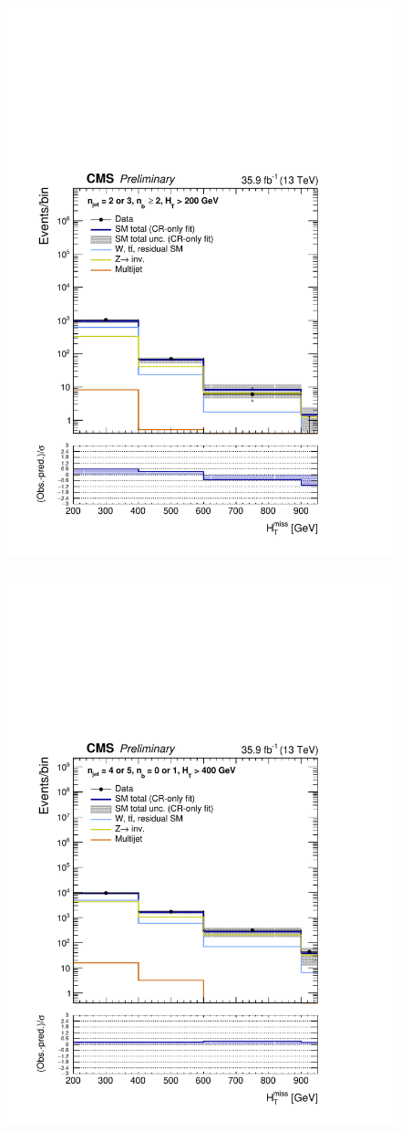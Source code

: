 \begin{figure}[h!]
  \includegraphics[width=0.8\linewidth]{figures/results/36invfb/aggregated/postFitShapeCR/mhtShape_ge2b_eq23j_200_Inf_crfit.pdf} ~
  \includegraphics[width=0.8\linewidth]{figures/results/36invfb/aggregated/postFitShapeCR/mhtShape_eq01b_eq45j_400_Inf_crfit.pdf} ~

\end{figure}
